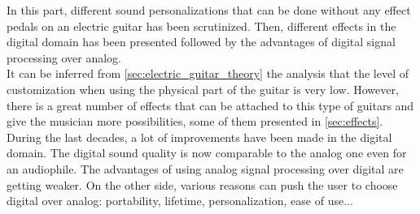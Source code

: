 In this part, different sound personalizations that can be done without any effect pedals on an electric guitar has been scrutinized. Then, different effects in the digital domain has been presented followed by the advantages of digital signal processing over analog. \\
\newline
It can be inferred from \autoref{sec:electric_guitar_theory} the analysis that the level of customization when using the physical part of the guitar is very low. However, there is a great number of effects that can be attached to this type of guitars and give the musician more possibilities, some of them presented in \autoref{sec:effects}.  \\
During the last decades, a lot of improvements have been made in the digital domain. The digital sound quality is now comparable to the analog one even for an audiophile. The advantages of using analog signal processing over digital are getting weaker. On the other side, various reasons can push the user to choose digital over analog: portability, lifetime, personalization, ease of use...
